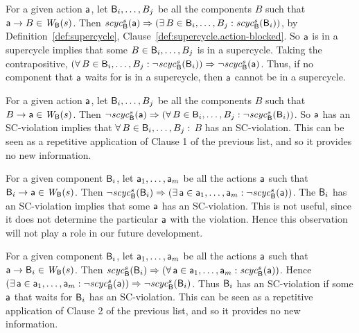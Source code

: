 \item For a given action $\mathsf{a}$, let $\mathsf{B}_i,\ldots,B_j$ be all the components $B$ such that $\mathsf{a} \rightarrow
  B \in \mathit{W}_{\mathsf{B}}({s})$.  Then 
 $\mathit{scyc}_{\mathsf{B}}^{s}({\mathsf{a}}) \Rightarrow (\exists\, B \in \mathsf{B}_i,\ldots,B_j: \mathit{scyc}_{\mathsf{B}}^{s}({\mathsf{B}_i}))$, by 
  Definition~\ref{def:supercycle}, Clause~\ref{def:supercycle.action-blocked}.
  So $\mathsf{a}$ is in a supercycle implies that some $B \in \mathsf{B}_i,\ldots,B_j$ is
  in a supercycle.  Taking the contrapositive, $(\forall\, B \in \mathsf{B}_i,\ldots,B_j: \neg \mathit{scyc}_{\mathsf{B}}^{s}({\mathsf{B}_i}))
  \Rightarrow \neg \mathit{scyc}_{\mathsf{B}}^{s}({\mathsf{a}})$.  Thus, if no component that $\mathsf{a}$ waits for is in a supercycle,
  then $\mathsf{a}$ cannot be in a supercycle.

\item For a given action $\mathsf{a}$, let $\mathsf{B}_i,\ldots,B_j$ be all the components $B$ such that $B \rightarrow \mathsf{a} \in \mathit{W}_{\mathsf{B}}({s})$.
Then $\neg \mathit{scyc}_{\mathsf{B}}^{s}({\mathsf{a}}) \Rightarrow (\forall\, B \in \mathsf{B}_i,\ldots,B_j: \neg \mathit{scyc}_{\mathsf{B}}^{s}({\mathsf{B}_i}))$.
So $\mathsf{a}$ has an SC-violation implies that $\forall\, B \in \mathsf{B}_i,\ldots,B_j:$ $B$ has an SC-violation.
This can be seen as a repetitive application of Clause 1 of the previous list, and so it provides no new information.

\item For a given component $\mathsf{B}_i$, let $\mathsf{a}_1,\ldots, \mathsf{a}_m$ be all the actions $\mathsf{a}$ such that $\mathsf{B}_i \rightarrow \mathsf{a} \in \mathit{W}_{\mathsf{B}}({s})$.
Then $\neg \mathit{scyc}_{\mathsf{B}}^{s}({\mathsf{B}_i}) \Rightarrow (\exists\, \mathsf{a} \in \mathsf{a}_1,\ldots,\mathsf{a}_m: \neg \mathit{scyc}_{\mathsf{B}}^{s}({\mathsf{a}}))$.
The $\mathsf{B}_i$ has an SC-violation implies that some $\mathsf{a}$ has an SC-violation. This is not useful, since it does not
determine the particular $\mathsf{a}$ with the violation. Hence this observation will not play a role in our future development.

\item For a given component $\mathsf{B}_i$, let $\mathsf{a}_1,\ldots, \mathsf{a}_m$ be all the actions $\mathsf{a}$ such that $\mathsf{a} \rightarrow \mathsf{B}_i \in \mathit{W}_{\mathsf{B}}({s})$.
Then $\mathit{scyc}_{\mathsf{B}}^{s}({\mathsf{B}_i}) \Rightarrow (\forall\, \mathsf{a} \in \mathsf{a}_1,\ldots,\mathsf{a}_m: \mathit{scyc}_{\mathsf{B}}^{s}({\mathsf{a}}))$.
Hence $(\exists\, \mathsf{a} \in \mathsf{a}_1,\ldots,\mathsf{a}_m: \neg \mathit{scyc}_{\mathsf{B}}^{s}({\mathsf{a}})) \Rightarrow \neg \mathit{scyc}_{\mathsf{B}}^{s}({\mathsf{B}_i})$.
Thus $\mathsf{B}_i$ has an SC-violation if some $\mathsf{a}$ that waits for $\mathsf{B}_i$ has an SC-violation.
This can be seen as a repetitive application of Clause 2 of the previous list, and so it provides no new information.

